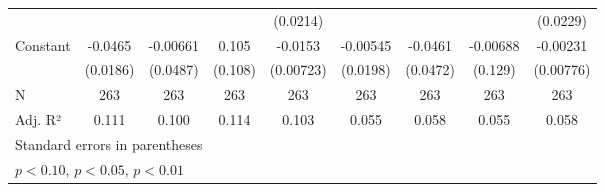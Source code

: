 {\begin{tabular}{l*{8}{c}}
                    &                     &                     &                     &    (0.0214)         &                     &                     &                     &    (0.0229)         \\
Constant            &     -0.0465\sym{**} &    -0.00661         &       0.105         &     -0.0153\sym{**} &    -0.00545         &     -0.0461         &    -0.00688         &    -0.00231         \\
                    &    (0.0186)         &    (0.0487)         &     (0.108)         &   (0.00723)         &    (0.0198)         &    (0.0472)         &     (0.129)         &   (0.00776)         \\
\hline
N                   &         263         &         263         &         263         &         263         &         263         &         263         &         263         &         263         \\
Adj. R²             &       0.111         &       0.100         &       0.114         &       0.103         &       0.055         &       0.058         &       0.055         &       0.058         \\
\hline\hline
\multicolumn{9}{l}{\footnotesize Standard errors in parentheses}\\
\multicolumn{9}{l}{\footnotesize \sym{*} \(p<0.10\), \sym{**} \(p<0.05\), \sym{***} \(p<0.01\)}\\
\end{tabular}
}
